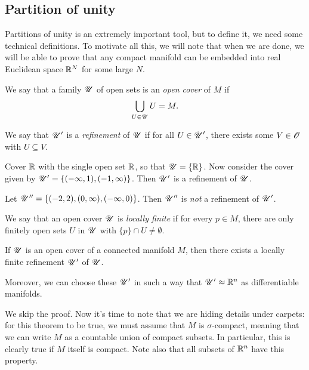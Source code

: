 \documentclass[11pt, english]{article}
\begin{document}
\subsection{Partition of unity}

Partitions of unity is an extremely important tool, but to define it, we need some technical definitions. To motivate all this, we will note that when we are done, we will be able to prove that any compact manifold can be embedded into real Euclidean space $\mathbb{R}^N$ for some large $N$.

\begin{defi}
  We say that a family $\mathscr{U}$ of open sets is an \emph{open cover} of $M$ if
\[
\bigcup_{U \in \mathscr{U}} U = M.
\]
\end{defi}
\begin{defi}
  We say that $\mathscr{U}^\prime$ is a \emph{refinement} of $\mathscr{U}$ if for all $U \in \mathscr{U}^\prime$, there exists some $V \in \operatorname{\mathscr{O}}$ with $U \subseteq V$. 
\end{defi}
\begin{example}
Cover $\mathbb{R}$ with the single open set $\mathbb{R}$, so that $\mathscr{U}=\{ \mathbb{R} \}$. Now consider the cover given by $\mathscr{U}^\prime = \{ (-\infty, 1),(-1,\infty) \}$. Then $\mathscr{U}^\prime$ is a refinement of $\mathscr{U}$.

Let $\mathscr{U}^{\prime \prime}=\{ (-2,2), (0,\infty), (-\infty,0) \}$. Then $\mathscr{U}^{\prime\prime}$ is \emph{not} a refinement of $\mathscr{U}^\prime$. 
\end{example}

\begin{defi}
  We say that an open cover $\mathscr{U}$ is \emph{locally finite} if for every $p \in M$, there are only finitely open sets $U$ in $\mathscr{U}$ with $\{ p \} \cap U \neq \emptyset$.
\end{defi}

\begin{thm}
  If $\mathscr{U}$ is an open cover of a connected manifold $M$, then there exists a locally finite refinement $\mathscr{U}^\prime$ of $\mathscr{U}$. 

Moreover, we can choose these $\mathscr{U}^\prime$ in such a way that $\mathscr{U}^\prime \approx \mathbb{R}^n$ as differentiable manifolds.
\end{thm}

\begin{remark}
We skip the proof. Now it's time to note that we are hiding details under carpets: for this theorem to be true, we must assume that $M$ is $\sigma$-compact, meaning that we can write $M$ as a countable union of compact subsets. In particular, this is clearly true if $M$ itself is compact. Note also that all subsets of $\mathbb{R}^n$ have this property.
\end{remark}
\end{document}

